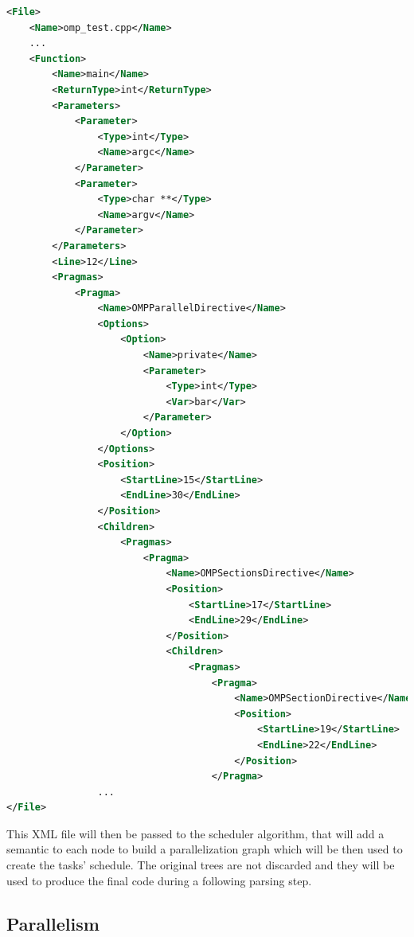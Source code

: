 \documentclass[a4paper,11pt,oneside]{book}
\begin{document}
\begin{lstlisting}[language=XML, caption=XML file of the pragma structure of Code~\ref{code}., label=xmlpragma]
<File>
    <Name>omp_test.cpp</Name>    
    ...
    <Function>
        <Name>main</Name>
        <ReturnType>int</ReturnType>
        <Parameters>
            <Parameter>
                <Type>int</Type>
                <Name>argc</Name>
            </Parameter>
            <Parameter>
                <Type>char **</Type>
                <Name>argv</Name>
            </Parameter>
        </Parameters>
        <Line>12</Line>
        <Pragmas>
            <Pragma>
                <Name>OMPParallelDirective</Name>
                <Options>
                    <Option>
                        <Name>private</Name>
                        <Parameter>
                            <Type>int</Type>
                            <Var>bar</Var>
                        </Parameter>
                    </Option>
                </Options>
                <Position>
                    <StartLine>15</StartLine>
                    <EndLine>30</EndLine>
                </Position>
                <Children>
                    <Pragmas>
                        <Pragma>
                            <Name>OMPSectionsDirective</Name>
                            <Position>
                                <StartLine>17</StartLine>
                                <EndLine>29</EndLine>
                            </Position>
                            <Children>
                                <Pragmas>
                                    <Pragma>
                                        <Name>OMPSectionDirective</Name>
                                        <Position>
                                            <StartLine>19</StartLine>
                                            <EndLine>22</EndLine>
                                        </Position>
                                    </Pragma>
				...
</File>
\end{lstlisting}

This XML file will then be passed to the scheduler algorithm, that will add a semantic to each node to build a parallelization graph  which will be then used to create the tasks’ schedule. The original trees are not discarded and they will be used to produce the final code during a following parsing step.

\subsection{Parallelism}
\end{document}
